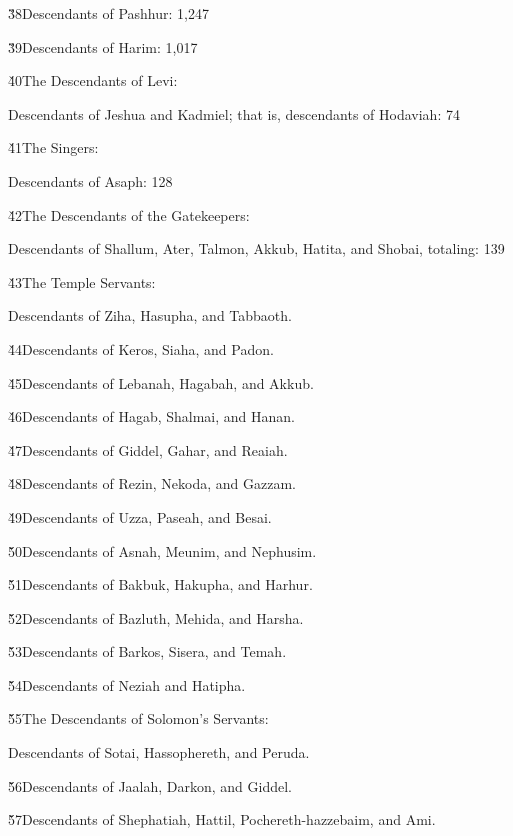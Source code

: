 \v{38}Descendants of Pashhur: 1,247

\v{39}Descendants of Harim: 1,017

\v{40}The Descendants of Levi:

Descendants of Jeshua and Kadmiel; that is, descendants of Hodaviah: 74

\v{41}The Singers:

Descendants of Asaph: 128

\v{42}The Descendants of the Gatekeepers:

Descendants of Shallum, Ater, Talmon, Akkub, Hatita, and Shobai, totaling: 139

\v{43}The Temple Servants:

Descendants of Ziha, Hasupha, and Tabbaoth.

\v{44}Descendants of Keros, Siaha, and Padon.

\v{45}Descendants of Lebanah, Hagabah, and Akkub.

\v{46}Descendants of Hagab, Shalmai, and Hanan.

\v{47}Descendants of Giddel, Gahar, and Reaiah.

\v{48}Descendants of Rezin, Nekoda, and Gazzam.

\v{49}Descendants of Uzza, Paseah, and Besai.

\v{50}Descendants of Asnah, Meunim, and Nephusim.

\v{51}Descendants of Bakbuk, Hakupha, and Harhur.

\v{52}Descendants of Bazluth, Mehida, and Harsha.

\v{53}Descendants of Barkos, Sisera, and Temah.

\v{54}Descendants of Neziah and Hatipha.

\v{55}The Descendants of Solomon's Servants:

Descendants of Sotai, Hassophereth, and Peruda.

\v{56}Descendants of Jaalah, Darkon, and Giddel.

\v{57}Descendants of Shephatiah, Hattil, Pochereth-hazzebaim, and Ami.

